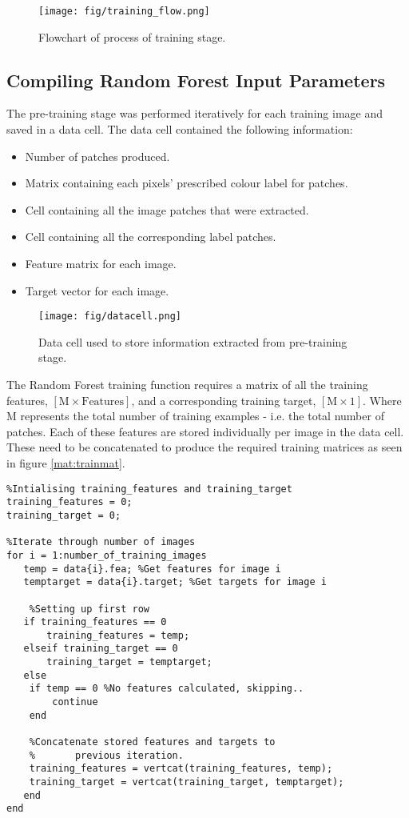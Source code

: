 \begin{figure}[H]
\centering
\texttt{[image: fig/training\_flow.png]}
\caption{Flowchart of process of training stage.}
\label{fig:trainingflow}
\end{figure}
\subsection{Compiling Random Forest Input Parameters}
The pre-training stage was performed iteratively for each training image and saved in a data cell. The data cell contained the following information: 
\begin{itemize}
	\item Number of patches produced.
	\item Matrix containing each pixels' prescribed colour label for patches.
	\item Cell containing all the image patches that were extracted.
	\item Cell containing all the corresponding label patches.
	\item Feature matrix for each image.
	\item Target vector for each image. 
\end{itemize}

\begin{figure}[H]
\centering
\texttt{[image: fig/datacell.png]}
\caption{Data cell used to store information extracted from pre-training stage.}
\label{mat:data}
\end{figure}

The Random Forest training function requires a matrix of all the training features, $[\textrm{M} \times \textrm{Features}]$, and a corresponding training target, $[\textrm{M}\times 1]$. Where M represents the total number of training examples - i.e. the total number of patches. Each of these features are stored individually per image in the data cell. These need to be concatenated to produce the required training matrices as seen in figure \ref{mat:trainmat}. 

\begin{lstlisting}
%Intialising training_features and training_target
training_features = 0;
training_target = 0;

%Iterate through number of images
for i = 1:number_of_training_images
   temp = data{i}.fea; %Get features for image i
   temptarget = data{i}.target; %Get targets for image i

	%Setting up first row   
   if training_features == 0
       training_features = temp;
   elseif training_target == 0
       training_target = temptarget;
   else
    if temp == 0 %No features calculated, skipping..
        continue
    end
    
    %Concatenate stored features and targets to 
    %		previous iteration.
    training_features = vertcat(training_features, temp);
    training_target = vertcat(training_target, temptarget);
   end
end
\end{lstlisting}


